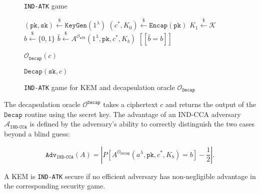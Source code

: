 \documentclass[runningheads]{llncs}
\newcommand{\keygen}{\texttt{KeyGen}}
\newcommand{\encap}{\texttt{Encap}}
\newcommand{\decap}{\texttt{Decap}}
\newcommand{\pk}{\texttt{pk}}
\newcommand{\sk}{\texttt{sk}}
\newcommand{\leftsample}{\stackrel{\$}{\leftarrow}}
\newcommand{\llbrack}{[\![}
\newcommand{\rrbrack}{]\!]}
\newcommand{\norm}[1]{\left\lvert #1 \right\rvert}
\newcommand{\adv}{\texttt{Adv}}
\begin{document}
\begin{figure}[H]
    \centering
    \begin{minipage}[t]{0.49\textwidth}
        \begin{algorithm}[H]
            \caption*{\texttt{IND-ATK} game}
            \begin{algorithmic}[1]
                \State $(\pk, \sk) \leftsample \keygen(1^\lambda)$
                \State $(c^\ast, K_0) \leftsample \encap(\pk)$
                \State $K_1 \leftsample \mathcal{K}$
                \State $b \leftsample \{0, 1\}$
                \State $\hat{b} \leftsample A^{\mathcal{O}_\texttt{ATK}}(
                    1^\lambda, \pk, c^\ast, K_b
                )$
                \State \Return $\llbrack \hat{b} = b \rrbrack$
            \end{algorithmic}
        \end{algorithm}
    \end{minipage}\hfill
    \begin{minipage}[t]{0.49\textwidth}
        \begin{algorithm}[H]
        \caption*{$\mathcal{O}_\decap(c)$}
        \begin{algorithmic}[1]
            \State \Return $\decap(\sk, c)$
        \end{algorithmic}
        \end{algorithm}
    \end{minipage}
    \caption{\texttt{IND-ATK} game for KEM and decapsulation oracle $\mathcal{O}_\decap$}\label{fig:kem-game}
\end{figure}

The decapsulation oracle $\mathcal{O}^\decap$ takes a ciphertext $c$ and returns the output of the $\decap$ routine using the secret key. The advantage of an IND-CCA adversary $\mathcal{A}_\texttt{IND-CCA}$ is defined by the adversary's ability to correctly distinguish the two cases beyond a blind guess:

\begin{equation*}
    \adv_\texttt{IND-CCA}(A) = \norm{
        P[A^{\mathcal{O}_\decap}(a^\lambda, \pk, c^\ast, K_b) = b] - \frac{1}{2}
    }.
\end{equation*}

A KEM is \texttt{IND-ATK} secure if no efficient adversary has non-negligible advantage in the corresponding security game.
\end{document}
